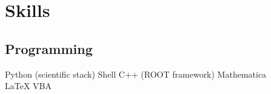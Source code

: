 \documentclass[]{deedy-resume-openfont}
\begin{document}
\begin{minipage}[t]{0.33\textwidth}

\section{Skills}
\subsection{Programming}
Python (scientific stack) \textbullet{} Shell \textbullet{} C++ (ROOT framework) \textbullet{} Mathematica\\
LaTeX \textbullet{} VBA \\ 
\sectionsep

%
%

\end{minipage} 
\hfill
\end{document}
